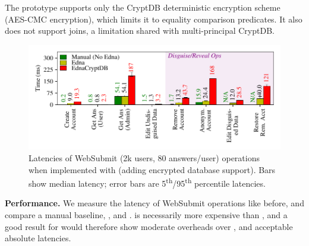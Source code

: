 
%
%
The prototype supports only the CryptDB deterministic encryption scheme
(AES-CMC encryption), which limits it to equality comparison predicates. It also does not
support joins, a limitation shared with multi-principal CryptDB.
%
%
%

\begin{figure}[t]
  \centering
      \includegraphics[width=\columnwidth]{figs/websubmit_cryptdb_op_stats}
    \caption[Latencies of Websubmit operations when implemented with
    \syscrypt.]{Latencies of WebSubmit (2k users, 80 answers/user) operations when
    implemented with \syscrypt (adding encrypted database support).
    Bars show median latency; error bars are
    5\textsuperscript{th}/95\textsuperscript{th} percentile latencies.}
  \label{f:cryptdb_ws_opstats}
\end{figure}

%
\textbf{Performance.}
We measure the latency of WebSubmit operations like before, and compare a manual
baseline, \sys, and \syscrypt.
%
\syscrypt is necessarily more expensive than \sys, and a good result for
\syscrypt would therefore show moderate overheads over \sys, and acceptable
absolute latencies.
%

